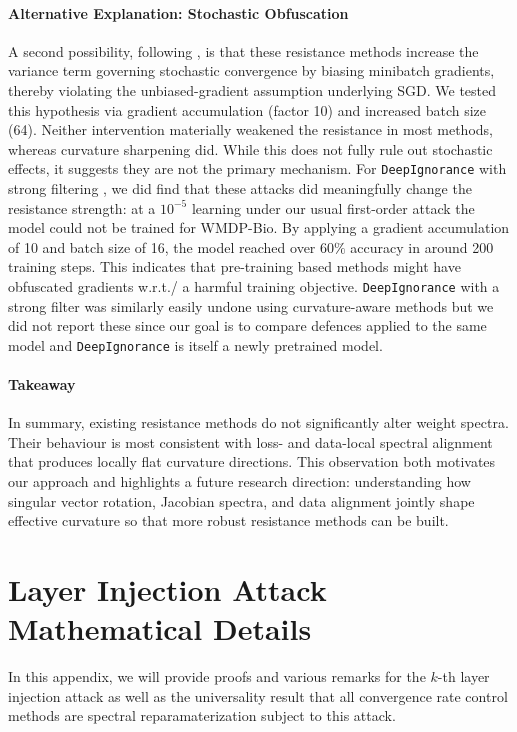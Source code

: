 \documentclass{article}
\theoremstyle{plain}
\theoremstyle{definition}
\theoremstyle{remark}
\begin{document}
\paragraph{Alternative Explanation: Stochastic Obfuscation}
A second possibility, following \citet{athalye2018obfuscated}, is that these resistance methods increase the variance term governing stochastic convergence by biasing minibatch gradients, thereby violating the unbiased-gradient assumption underlying SGD. We tested this hypothesis via gradient accumulation (factor 10) and increased batch size (64). Neither intervention materially weakened the resistance in most methods, whereas curvature sharpening did. While this does not fully rule out stochastic effects, it suggests they are not the primary mechanism. For \texttt{DeepIgnorance} with strong filtering \citep{o2025deep}, we did find that these attacks did meaningfully change the resistance strength: at a $10^{-5}$ learning under our usual first-order attack the model could not be trained for WMDP-Bio. By applying a gradient accumulation of 10 and batch size of 16, the model reached over $60\%$ accuracy in around 200 training steps. This indicates that pre-training based methods might have obfuscated gradients w.r.t./ a harmful training objective. \texttt{DeepIgnorance} with a strong filter was similarly easily undone using curvature-aware methods but we did not report these since our goal is to compare defences applied to the same model and \texttt{DeepIgnorance} is itself a newly pretrained model.


\paragraph{Takeaway}
In summary, existing resistance methods do not significantly alter weight spectra. Their behaviour is most consistent with loss- and data-local spectral alignment that produces locally flat curvature directions. This observation both motivates our approach and highlights a future research direction: understanding how singular vector rotation, Jacobian spectra, and data alignment jointly shape effective curvature so that more robust resistance methods can be built.

\section{Layer Injection Attack Mathematical Details}
\label{app:layer-injection-details}

In this appendix, we will provide proofs and various remarks for the $k$-th layer injection attack as well as the universality result that all convergence rate control methods are spectral reparamaterization subject to this attack.
\end{document}
